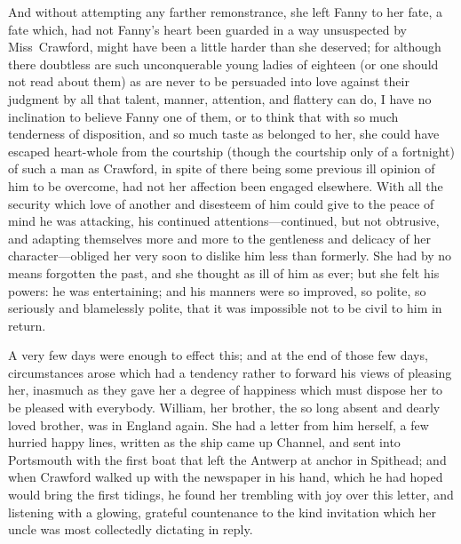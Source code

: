 And without attempting any farther remonstrance, she left Fanny to her fate, a fate which, had not Fanny's heart been guarded in a way unsuspected by Miss~Crawford, might have been a little harder than she deserved; for although there doubtless are such unconquerable young ladies of eighteen (or one should not read about them) as are never to be persuaded into love against their judgment by all that talent, manner, attention, and flattery can do, I have no inclination to believe Fanny one of them, or to think that with so much tenderness of disposition, and so much taste as belonged to her, she could have escaped heart-whole from the courtship (though the courtship only of a fortnight) of such a man as Crawford, in spite of there being some previous ill opinion of him to be overcome, had not her affection been engaged elsewhere. With all the security which love of another and disesteem of him could give to the peace of mind he was attacking, his continued attentions—continued, but not obtrusive, and adapting themselves more and more to the gentleness and delicacy of her character—obliged her very soon to dislike him less than formerly. She had by no means forgotten the past, and she thought as ill of him as ever; but she felt his powers: he was entertaining; and his manners were so improved, so polite, so seriously and blamelessly polite, that it was impossible not to be civil to him in return.

A very few days were enough to effect this; and at the end of those few days, circumstances arose which had a tendency rather to forward his views of pleasing her, inasmuch as they gave her a degree of happiness which must dispose her to be pleased with everybody. William, her brother, the so long absent and dearly loved brother, was in England again. She had a letter from him herself, a few hurried happy lines, written as the ship came up Channel, and sent into Portsmouth with the first boat that left the Antwerp at anchor in Spithead; and when Crawford walked up with the newspaper in his hand, which he had hoped would bring the first tidings, he found her trembling with joy over this letter, and listening with a glowing, grateful countenance to the kind invitation which her uncle was most collectedly dictating in reply.

